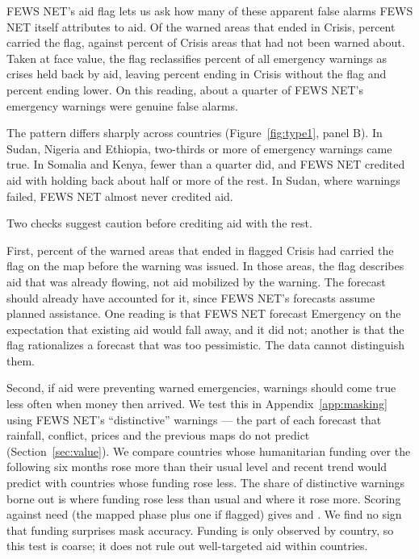 \documentclass[11pt]{article}
\begin{document}
FEWS NET's aid flag lets us ask how many of these apparent false alarms FEWS NET itself attributes to aid. Of the warned areas that ended in Crisis, \tIflagShareOfCrisis{} percent carried the flag, against \tIflagUnwarnedCrisis{} percent of Crisis areas that had not been warned about. Taken at face value, the flag reclassifies \tIflagged{} percent of all emergency warnings as crises held back by aid, leaving \tIunflagged{} percent ending in Crisis without the flag and \tIbetter{} percent ending lower. On this reading, about a quarter of FEWS NET's emergency warnings were genuine false alarms.

The pattern differs sharply across countries (Figure~\ref{fig:type1}, panel B). In Sudan, Nigeria and Ethiopia, two-thirds or more of emergency warnings came true. In Somalia and Kenya, fewer than a quarter did, and FEWS NET credited aid with holding back about half or more of the rest. In Sudan, where warnings failed, FEWS NET almost never credited aid.

Two checks suggest caution before crediting aid with the rest.

First, \tIflaggedAlreadyFlagged{} percent of the warned areas that ended in flagged Crisis had carried the flag on the map before the warning was issued. In those areas, the flag describes aid that was already flowing, not aid mobilized by the warning. The forecast should already have accounted for it, since FEWS NET's forecasts assume planned assistance. One reading is that FEWS NET forecast Emergency on the expectation that existing aid would fall away, and it did not; another is that the flag rationalizes a forecast that was too pessimistic. The data cannot distinguish them.

Second, if aid were preventing warned emergencies, warnings should come true less often when money then arrived. We test this in Appendix~\ref{app:masking} using FEWS NET's ``distinctive'' warnings --- the part of each forecast that rainfall, conflict, prices and the previous maps do not predict (Section~\ref{sec:value}). We compare countries whose humanitarian funding over the following six months rose more than their usual level and recent trend would predict with countries whose funding rose less. The share of distinctive warnings borne out is \maskMappedLow{} where funding rose less than usual and \maskMappedHigh{} where it rose more. Scoring against need (the mapped phase plus one if flagged) gives \maskNeedLow{} and \maskNeedHigh{}. We find no sign that funding surprises mask accuracy. Funding is only observed by country, so this test is coarse; it does not rule out well-targeted aid within countries.
\end{document}
